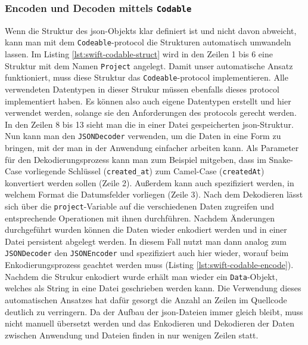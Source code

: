 \subsubsection{Encoden und Decoden mittels \texttt{Codable}}
Wenn die Struktur des \ac{json}-Objekts klar definiert ist und nicht davon abweicht, kann man mit dem \texttt{Codeable}-\Gls{protocol} die Strukturen automatisch umwandeln lassen.
Im Listing \ref{lst:swift-codable-struct} wird in den Zeilen 1 bis 6 eine Struktur mit dem Namen \texttt{Project} angelegt.
Damit unser automatische Ansatz funktioniert, muss diese Struktur das \texttt{Codeable}-\Gls{protocol} implementieren.
Alle verwendeten Datentypen in dieser Strukur müssen ebenfalls dieses \Gls{protocol} implementiert haben.
Es können also auch eigene Datentypen erstellt und hier verwendet werden, solange sie den Anforderungen des \Glspl{protocol} gerecht werden.
In den Zeilen 8 bis 13 sieht man die in einer Datei gespeicherten \ac{json}-Struktur.
Nun kann man den \texttt{JSONDecoder} verwenden, um die Daten in eine Form zu bringen, mit der man in der Anwendung einfacher arbeiten kann.
Als Parameter für den Dekodierungsprozess kann man zum Beispiel mitgeben, dass im Snake-Case vorliegende Schlüssel (\texttt{created\_at}) zum Camel-Case (\texttt{createdAt}) konvertiert werden sollen (Zeile 2).
Außerdem kann auch spezifiziert werden, in welchem Format die Datumsfelder vorliegen (Zeile 3).
Nach dem Dekodieren lässt sich über die \texttt{project}-Variable auf die verschiedenen Daten zugreifen und entsprechende Operationen mit ihnen durchführen.
Nachdem Änderungen durchgeführt wurden können die Daten wieder enkodiert werden und in einer Datei persistent abgelegt werden.
In diesem Fall nutzt man dann analog zum \texttt{JSONDecoder} den \texttt{JSONEncoder} und spezifiziert auch hier wieder, worauf beim Enkodierungsprozess geachtet werden muss (Listing \ref{lst:swift-codable-encode}).
Nachdem die Strukur enkodiert wurde erhält man wieder ein \texttt{Data}-Objekt, welches als String in eine Datei geschrieben werden kann.\pbreak%
%
Die Verwendung dieses automatischen Ansatzes hat dafür gesorgt die Anzahl an Zeilen im Quellcode deutlich zu verringern.
Da der Aufbau der \ac{json}-Dateien immer gleich bleibt, muss nicht manuell übersetzt werden und das Enkodieren und Dekodieren der Daten zwischen Anwendung und Dateien finden in nur wenigen Zeilen statt.


